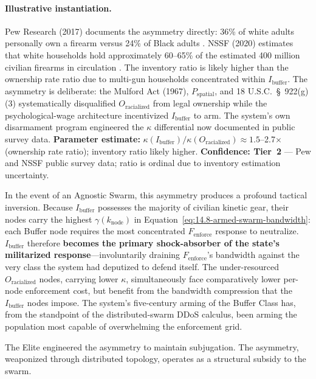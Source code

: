 \paragraph{Illustrative instantiation.}
Pew Research (2017) documents the asymmetry directly: 36\% of white adults personally own a firearm versus 24\% of Black adults \cite{pew_gun_ownership_2017}. NSSF (2020) estimates that white households hold approximately 60--65\% of the estimated 400 million civilian firearms in circulation \cite{nssf2020}. The inventory ratio is likely higher than the ownership rate ratio due to multi-gun households concentrated within $I_{\text{buffer}}$. The asymmetry is deliberate: the Mulford Act (1967), $P_{\text{spatial}}$, and 18 U.S.C.~\S~922(g)(3) systematically disqualified $O_{\text{racialized}}$ from legal ownership while the psychological-wage architecture incentivized $I_{\text{buffer}}$ to arm. The system's own disarmament program engineered the $\kappa$ differential now documented in public survey data. \textbf{Parameter estimate:} $\kappa(I_{\text{buffer}}) / \kappa(O_{\text{racialized}}) \approx 1.5$--2.7$\times$ (ownership rate ratio); inventory ratio likely higher. \textbf{Confidence: Tier~2} --- Pew and NSSF public survey data; ratio is ordinal due to inventory estimation uncertainty.

In the event of an Agnostic Swarm, this asymmetry produces a profound tactical inversion. Because $I_{\text{buffer}}$ possesses the majority of civilian kinetic gear, their nodes carry the highest $\gamma(k_{\text{node}})$ in Equation~\eqref{eq:14.8-armed-swarm-bandwidth}: each Buffer node requires the most concentrated $F_{\text{enforce}}$ response to neutralize. $I_{\text{buffer}}$ therefore \textbf{becomes the primary shock-absorber of the state's militarized response}---involuntarily draining $F_{\text{enforce}}$'s bandwidth against the very class the system had deputized to defend itself. The under-resourced $O_{\text{racialized}}$ nodes, carrying lower $\kappa$, simultaneously face comparatively lower per-node enforcement cost, but benefit from the bandwidth compression that the $I_{\text{buffer}}$ nodes impose. The system's five-century arming of the Buffer Class has, from the standpoint of the distributed-swarm DDoS calculus, been arming the population most capable of overwhelming the enforcement grid.

The Elite engineered the asymmetry to maintain subjugation. The asymmetry, weaponized through distributed topology, operates as a structural subsidy to the swarm.

